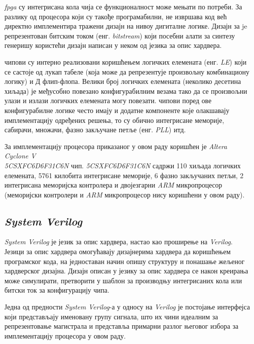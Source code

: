 \textit{\acrfull{fpga}} су интегрисана кола чија се функционалност може мењати по потреби. За разлику од процесора који су такође програмабилни,  не извршава код већ директно имплементира тражени дизајн на нивоу дигиталне логике. Дизајн за  je репрезентован битским током (енг. \textit{bitstream}) који посебни алати за синтезу генеришу користећи дизајн написан у неком од језика за опис хардвера.

 чипови су интерно реализовани коришћењем логичких елемената (енг. \textit{\acrfull{LE}}) који се састоје од лукап табеле (која може да репрезентује произвољну комбинациону логику) и Д флип-флопа.
Велики број логичких елемената (неколико десетина хиљада) је међусобно повезано конфигурабилним везама тако да се произвољни улази и излази логичких елемената могу повезати.
 чипови поред ове конфигурабилне логике често имају и додатне компоненте које олакшавају имплементацију одређених решења, то су обично интегрисане меморије, сабирачи, множачи, фазно закључане петље (енг. \textit{\acrfull{PLL}}) итд.

За имплементацију процесора приказаног у овом раду коришћен је \textit{Altera Cyclone V \\ 5CSXFC6D6F31C6N} \cite{cycv_hb}  чип.
\textit{5CSXFC6D6F31C6N} садржи 110 хиљада логичких елемената, 5761 килобита интегрисане меморије, 6 фазно закључаних петљи, 2 интегрисана меморијска контролера и двојезгарни \textit{ARM} микропроцесор (меморијски контролери и \textit{ARM} микропроцесор нису коришћени у овом раду). 

\subsection{\textit{System Verilog}}

\textit{System Verilog} \cite{sv_spec} је језик за опис хардвера, настао као проширење на \textit{Verilog}.
Језици за опис хардвера омогућавају дизајнерима хардвера да коришћењем програмског кода, на једноставан начин опишу структуру и понашање жељеног хардверског дизајна.
Дизајн описан у језику за опис хардвера се након креирања може симулирати, претворити у шаблон за производњу интегрисаних кола или битски ток за конфигурацију  чипа.

Једна од предности \textit{System Verilog}-а у односу на \textit{Verilog} је постојање интерфејса који представљају именовану групу сигнала, што их чини идеалним за репрезентовање магистрала и представља примарни разлог његовог избора за имплементацију процесора у овом раду.

